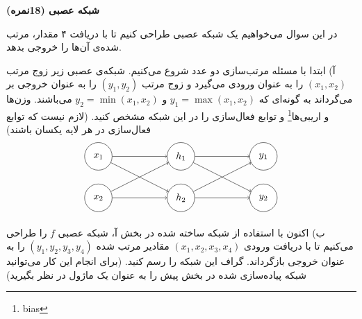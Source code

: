 \textbf{شبکه عصبی (18نمره)}



در این سوال می‌خواهیم یک شبکه عصبی طراحی کنیم تا با دریافت ۴ مقدار، مرتب‌ شده‌ی آن‌ها را خروجی بدهد.

آ) ابتدا با مسئله مرتب‌سازی دو عدد شروع می‌کنیم. شبکه‌ی عصبی زیر زوج مرتب $(x_1, x_2)$ را به عنوان ورودی می‌گیرد و زوج مرتب $(y_1, y_2)$ را به عنوان خروجی بر می‌گرداند به گونه‌ای که $y_1 = \max(x_1, x_2)$ و $y_2 = \min(x_1, x_2)$ می‌باشند. وزن‌ها و اریبی‌ها\footnote{bias} و توابع فعال‌سازی را در این شبکه مشخص کنید. (لازم نیست که توابع فعال‌سازی در هر لایه یکسان باشند)
\begin{align*} 
    \begin{tikzpicture}[scale=1, transform shape] 
        \foreach \m/\l [count=\y] in {1,2} \node [circle, draw=black, fill=white!30, minimum size=10mm] (input-\m) at (0,-\y*1.5) {$x_\m$}; 
        \foreach \m [count=\y] in {1,2} \node [circle, draw=black, fill=white!30, minimum size=10mm] (hidden-\m) at (3,-\y*1.5) {$h_\m$}; 
        \foreach \m [count=\y] in {1,2} \node [circle, draw=black, fill=white!30, minimum size=10mm] (output-\m) at (6,-\y*1.5) {$y_\m$}; 
        \foreach \i in {1,2} \foreach \j in {1,2} \draw[->] (input-\i) -- (hidden-\j); 
        \foreach \i in {1,2} \foreach \j in {1,2} \draw[->] (hidden-\i) -- (output-\j); 
    \end{tikzpicture} 
\end{align*}


ب) اکنون با استفاده از شبکه ساخته شده در بخش آ، شبکه عصبی $f$ را طراحی می‌کنیم تا با دریافت ورودی $(x_1, x_2, x_3, x_4)$ مقادیر مرتب شده $(y_1,y_2,y_3,y_4)$ را به عنوان خروجی بازگرداند. گراف این شبکه را رسم کنید. (برای انجام این کار می‌توانید شبکه پیاده‌سازی شده در بخش پیش را به عنوان یک ماژول در نظر بگیرید)
